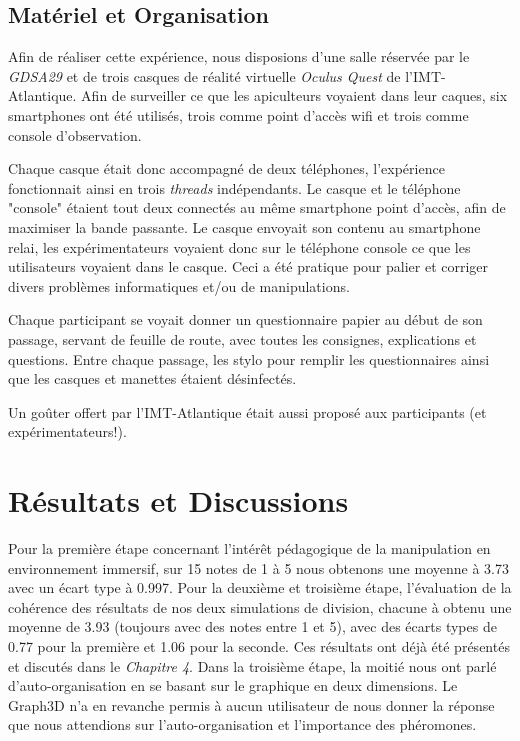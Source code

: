 		
		\subsection{Matériel et Organisation}
		Afin de réaliser cette expérience, nous disposions d'une salle réservée par le \textit{GDSA29} et de trois casques de réalité virtuelle \textit{Oculus Quest} de l'IMT-Atlantique. Afin de surveiller ce que les apiculteurs voyaient dans leur caques, six smartphones ont été utilisés, trois comme point d'accès wifi et trois comme console d'observation.
		
		Chaque casque était donc accompagné de deux téléphones, l'expérience fonctionnait ainsi en trois \textit{threads} indépendants. Le casque et le téléphone "console" étaient tout deux connectés au même smartphone point d'accès, afin de maximiser la bande passante. Le casque envoyait son contenu au smartphone relai, les expérimentateurs voyaient donc sur le téléphone console ce que les utilisateurs voyaient dans le casque. Ceci a été pratique pour palier et corriger divers problèmes informatiques et/ou de manipulations.
		
		Chaque participant se voyait donner un questionnaire papier au début de son passage, servant de feuille de route, avec toutes les consignes, explications et questions. Entre chaque passage, les stylo pour remplir les questionnaires ainsi que les casques et manettes étaient désinfectés. 
		
		Un goûter offert par l'IMT-Atlantique était aussi proposé aux participants (et expérimentateurs!).
		
		
		
	\section{Résultats et Discussions}
	Pour la première étape concernant l'intérêt pédagogique de la manipulation en environnement immersif, sur 15 notes de 1 à 5 nous obtenons une moyenne à 3.73 avec un écart type à 0.997.
    Pour la deuxième et troisième étape, l'évaluation de la cohérence des résultats de nos deux simulations de division, chacune à obtenu une moyenne de 3.93 (toujours avec des notes entre 1 et 5), avec des écarts types de 0.77 pour la première et 1.06 pour la seconde. Ces résultats ont déjà été présentés et discutés dans le \textit{Chapitre 4}.
    Dans la troisième étape, la moitié nous ont parlé d'auto-organisation en se basant sur le graphique en deux dimensions. Le Graph3D n'a en revanche permis à aucun utilisateur de nous donner la réponse que nous attendions sur l'auto-organisation et l'importance des phéromones. 

